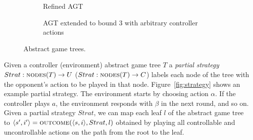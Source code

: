 \documentclass{llncs}
\begin{document}
\begin{figure}
\begin{subfigure}[t]{.25\textwidth}
        \captionsetup{width=.8\textwidth}
        \caption{Refined AGT}
        \label{fig:refined}
    \end{subfigure}%
    \begin{subfigure}[t]{.25\textwidth}
        \centering
        \captionsetup{width=.8\textwidth}
        \caption{AGT extended to bound 3 with arbitrary controller actions}
        \label{fig:extended}
    \end{subfigure}
    \caption{Abstract game trees.}
    \label{fig:alltrees}
\end{figure}

Given a controller (environment) abstract game tree $T$ a \emph{partial
strategy} $Strat: \textsc{nodes}(T) \rightarrow U$ ($Strat: \textsc{nodes}(T)
\rightarrow C$) labels each node of the tree with the opponent's action to be
played in that node.   Figure~\ref{fig:strategy} shows an example partial
strategy.  The environment starts by choosing action $\alpha$.  If the
controller plays $a$, the environment responds with $\beta$ in the next round,
and so on. Given a partial strategy $Strat$, we can map each leaf $l$ of the
abstract game tree to $\langle s',i'\rangle=\textsc{outcome}(\langle s,
i\rangle, Strat, l)$ obtained by playing all controllable and uncontrollable
actions on the path from the root to the leaf.
\end{document}
